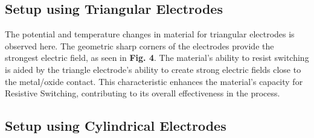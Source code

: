 \documentclass[conference]{IEEEtran}
\begin{document}

\subsection{Setup using Triangular Electrodes}

The potential and temperature changes in material for triangular electrodes is observed here. The geometric sharp corners of the electrodes provide the strongest electric field, as seen in \textbf{ Fig. 4}. The material's ability to resist switching is aided by the triangle electrode's ability to create strong electric fields close to the metal/oxide contact.
This characteristic enhances the material's capacity for Resistive Switching, contributing to its overall effectiveness in the process.




\subsection{Setup using Cylindrical Electrodes}
\end{document}
